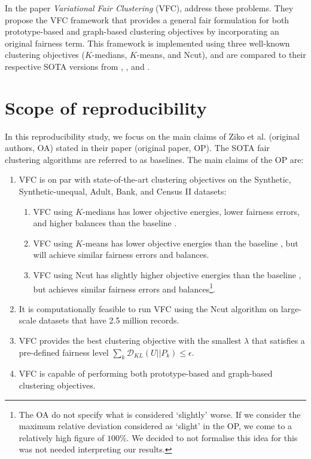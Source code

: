In the paper \textit{Variational Fair Clustering} (VFC), \cite{ziko2021variational} address these problems. They propose the VFC framework that provides a general fair formulation for both prototype-based and graph-based clustering objectives by incorporating an original fairness term. This framework is implemented using three well-known clustering objectives ($K$-medians, $K$-means, and Ncut), and are compared to their respective SOTA versions from \cite{backurs2019scalable}, \cite{bera2019fair}, and \cite{kleindessner2019guarantees}.



\section{Scope of reproducibility}
\label{sec:scope}
In this reproducibility study, we focus on the main claims of Ziko et al. (original authors, OA) stated in their paper (original paper, OP). The SOTA fair clustering algorithms are referred to as baselines. The main claims of the OP are:

\begin{enumerate}[start=1, noitemsep, label={Claim \arabic*}]
	\item\label{claim:1} VFC is on par with state-of-the-art clustering objectives on the Synthetic, Synthetic-unequal, Adult, Bank, and Census II datasets:
	\begin{enumerate}[noitemsep, label=\alph*]
		\item VFC using $K$-medians has lower objective energies, lower fairness errors, and higher balances than the baseline \cite{backurs2019scalable}. \label{claim:1a}
		\item VFC using $K$-means has lower objective energies than the baseline \cite{bera2019fair}, but will achieve similar fairness errors and balances. \label{claim:1b}
		\item VFC using Ncut has slightly higher objective energies than the baseline \cite{kleindessner2019guarantees}, but achieves similar fairness errors and balances\footnote{The OA do not specify what is considered `slightly' worse. If we consider the maximum relative deviation considered as `slight' in the OP, we come to a relatively high figure of $100\%$. We decided to not formalise this idea for this was not needed interpreting our results.}. \label{claim:1c}
	\end{enumerate}
	\item\label{claim:2} It is computationally feasible to run VFC using the Ncut algorithm on large-scale datasets that have 2.5 million records.
	\item\label{claim:3} VFC provides the best clustering objective with the smallest $\lambda$ that satisfies a pre-defined fairness level $\sum_k \mathcal{D}_{KL}(U||P_k)\leq \epsilon$.
	\item\label{claim:4} VFC is capable of performing both prototype-based and graph-based clustering objectives.
\end{enumerate}




